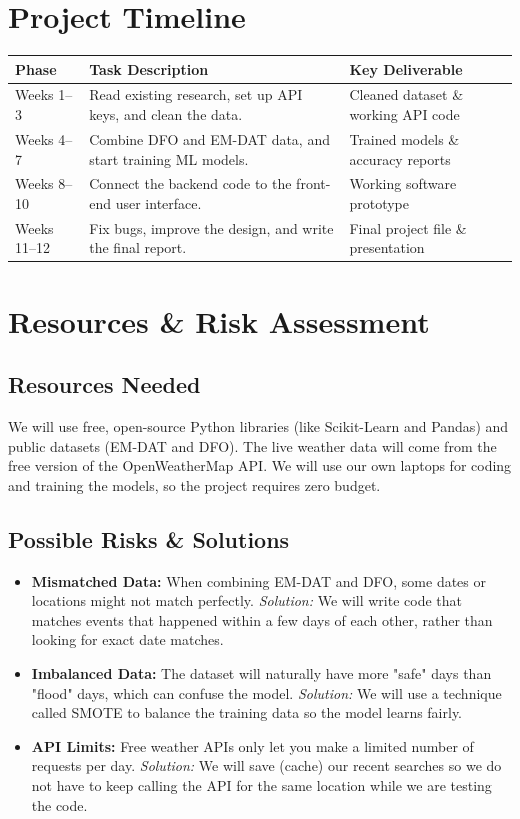 \documentclass[11pt,a4paper]{article}
\begin{document}
\section{Project Timeline}
\begin{table}[H]
\centering
\begin{tabular}{@{} l p{7.5cm} p{5cm} @{}}
\toprule
\textbf{Phase} & \textbf{Task Description} & \textbf{Key Deliverable} \\ \midrule
Weeks 1--3 & Read existing research, set up API keys, and clean the data. & Cleaned dataset \& working API code \\
Weeks 4--7 & Combine DFO and EM-DAT data, and start training ML models. & Trained models \& accuracy reports \\
Weeks 8--10 & Connect the backend code to the front-end user interface. & Working software prototype \\
Weeks 11--12 & Fix bugs, improve the design, and write the final report. & Final project file \& presentation \\ \bottomrule
\end{tabular}
\end{table}

\section{Resources \& Risk Assessment}
\subsection{Resources Needed}
We will use free, open-source Python libraries (like Scikit-Learn and Pandas) and public datasets (EM-DAT and DFO). The live weather data will come from the free version of the OpenWeatherMap API. We will use our own laptops for coding and training the models, so the project requires zero budget.

\subsection{Possible Risks \& Solutions}
\begin{itemize}
    \item \textbf{Mismatched Data:} When combining EM-DAT and DFO, some dates or locations might not match perfectly. \textit{Solution:} We will write code that matches events that happened within a few days of each other, rather than looking for exact date matches.
    \item \textbf{Imbalanced Data:} The dataset will naturally have more "safe" days than "flood" days, which can confuse the model. \textit{Solution:} We will use a technique called SMOTE to balance the training data so the model learns fairly.
    \item \textbf{API Limits:} Free weather APIs only let you make a limited number of requests per day. \textit{Solution:} We will save (cache) our recent searches so we do not have to keep calling the API for the same location while we are testing the code.
\end{itemize}
\end{document}
